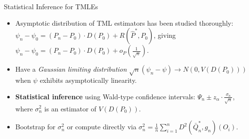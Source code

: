 \documentclass[12pt,t,handout]{beamer}
\begin{document}
\begin{frame}[c]{Statistical Inference for TMLEs}

\begin{center}
\begin{itemize}
  \itemsep10pt
  \item Asymptotic distribution of TML estimators has been studied thoroughly:
    $\psi_n - \psi_0 = (P_n - P_0) \cdot D(P_0) + R(\hat{P}^*, P_0)$, giving
    $\psi_n - \psi_0 = (P_n - P_0) \cdot D(P_0) + o_P \left( \frac{1}{\sqrt{n}}
    \right)$.
  \item Have a \textit{Gaussian limiting distribution}
    $\sqrt{n}(\psi_n - \psi) \to N(0, V(D(P_0)))$ when $\psi$ exhibits
    asymptotically linearity.
  \item \textbf{Statistical inference} using Wald-type confidence intervals:
    $\Psi_n \pm z_{\alpha} \cdot \frac{\sigma_n}{\sqrt{n}}$, where $\sigma_n^2$
    is an estimator of $V(D(P_0))$.
  \item Bootstrap for $\sigma_n^2$ or compute directly via
    $\sigma_n^2 = \frac{1}{n} \sum_{i = 1}^{n} D^2(\bar{Q}_n^*, g_n)(O_i)$.
\end{itemize}
\end{center}


\end{frame}

\end{document}
